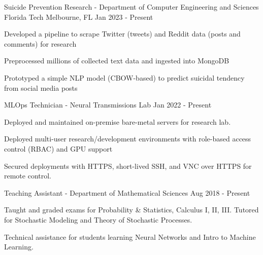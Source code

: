 \vspace{-4mm}
\vspace{-2mm}

\begin{cventries}

	\cventry
	{Suicide Prevention Research - Department of Computer Engineering and Sciences}
	{Florida Tech}
	{Melbourne, FL}
	{Jan 2023 - Present}
	{\begin{cvitems}
			\item {Developed a pipeline to scrape Twitter (tweets) and Reddit data (posts and comments) for research}
			\item {Preprocessed millions of collected text data and ingested into MongoDB}
			\item {Prototyped a simple NLP model (CBOW-based) to predict suicidal tendency from social media posts}
		\end{cvitems}}

	\vspace{-2mm}

	\cventry
	{MLOps Technician - Neural Transmissions Lab}
	{}
	{}
	{Jan 2022 - Present}
	{\begin{cvitems}
			\item {Deployed and maintained on-premise bare-metal servers for research lab.}
			\item {Deployed multi-user research/development environments with role-based access control (RBAC) and GPU support}
			\item {Secured deployments with HTTPS, short-lived SSH, and VNC over HTTPS for remote control.}
		\end{cvitems}}

	\vspace{-2mm}

	\cventry
	{Teaching Assistant - Department of Mathematical Sciences}
	{}
	{}
	{Aug 2018 - Present}
	{\begin{cvitems}
			\item {Taught and graded exams for Probability \& Statistics, Calculus I, II, III. Tutored for Stochastic Modeling and Theory of Stochastic Processes.}
			\item {Technical assistance for students learning Neural Networks and Intro to Machine Learning.}
		\end{cvitems}}


\end{cventries}
